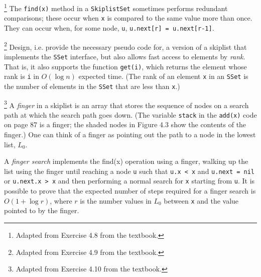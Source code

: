 \documentclass[addpoints]{exam}
\begin{document}
\begin{questions}

\footnote{Adapted from Exercise 4.8 from the textbook.}
  The \texttt{find(x)} method in a \texttt{SkiplistSet} sometimes performs redundant comparisons; these occur when \texttt{x} is compared to the same value more than once. They can occur when, for some node, \texttt{u}, \texttt{u.next[r] = u.next[r-1]}.

\footnote{Adapted from Exercise 4.9 from the textbook.}
  Design, i.e. provide the necessary pseudo code for, a version of a skiplist that implements the \texttt{SSet} interface, but also allows fast access to elements by \textit{rank}. That is, it also supports the function \texttt{get(i)}, which returns the element whose rank is \texttt{i} in $O(\log n)$ expected time. (The rank of an element \texttt{x} in an \texttt{SSet} is the number of elements in the \texttt{SSet} that are less than \texttt{x}.)
  \begin{solution}
  \end{solution}

\footnote{Adapted from Exercise 4.10 from the textbook.}
  A \textit{finger} in a skiplist is an array that stores the sequence of nodes on a search path at which the search path goes down. (The variable \texttt{stack} in the \texttt{add(x)} code on page 87 is a finger; the shaded nodes in Figure 4.3 show the contents of the finger.) One can think of a finger as pointing out the path to a node in the lowest list, $L_0$.
  
  A \textit{finger search} implements the find(x) operation using a finger, walking up the list using the finger until reaching a node \texttt{u} such that \texttt{u.x < x} and \texttt{u.next = nil} or \texttt{u.next.x > x} and then performing a normal search for \texttt{x} starting from \texttt{u}. It is possible to prove that the expected number of steps required for a finger search is $O(1+\log r)$, where $r$ is the number values in $L_0$ between \texttt{x} and the value pointed to by the finger.


\end{questions}
\end{document}
